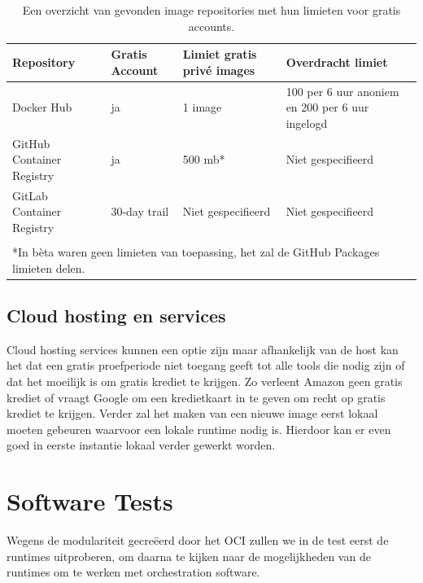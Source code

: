 \begin{center}
    \begin{table}
        \begin{tabular}{ m{3.5cm} || m{2cm} | m{3.3cm} | m{4.5cm} }
            Repository & Gratis Account & Limiet gratis privé images & Overdracht limiet \\ 
            \hline
            Docker Hub & ja & 1 image & 100 per 6 uur anoniem en 200 per 6 uur ingelogd
             \\  
            \hline
            GitHub Container Registry & ja & 500 mb* & Niet gespecifieerd \\
            \hline 
            GitLab Container Registry & 30-day trail & Niet gespecifieerd & Niet gespecifieerd \\
            \multicolumn{4}{c}{ } \\
            \multicolumn{4}{l}{*In bèta waren geen limieten van toepassing, het zal de GitHub Packages limieten delen.} \\
        \end{tabular}
        \caption[Overzicht image repositories]{Een overzicht van gevonden image repositories met hun limieten voor gratis accounts.}
        \label{tab:repositories}
    \end{table}
\end{center}

\subsection{Cloud hosting en services}
Cloud hosting services kunnen een optie zijn maar afhankelijk van de host kan het dat een gratis proefperiode niet toegang geeft tot alle tools die nodig zijn of dat het moeilijk is om gratis krediet te krijgen. Zo verleent Amazon geen gratis krediet of vraagt Google om een kredietkaart in te geven om recht op gratis krediet te krijgen. Verder zal het maken van een nieuwe image eerst lokaal moeten gebeuren waarvoor een lokale runtime nodig is. Hierdoor kan er even goed in eerste instantie lokaal verder gewerkt worden.

\section{Software Tests}
Wegens de modulariteit gecreëerd door het OCI zullen we in de test eerst de runtimes uitproberen, om daarna te kijken naar de mogelijkheden van de runtimes om te werken met orchestration software.

